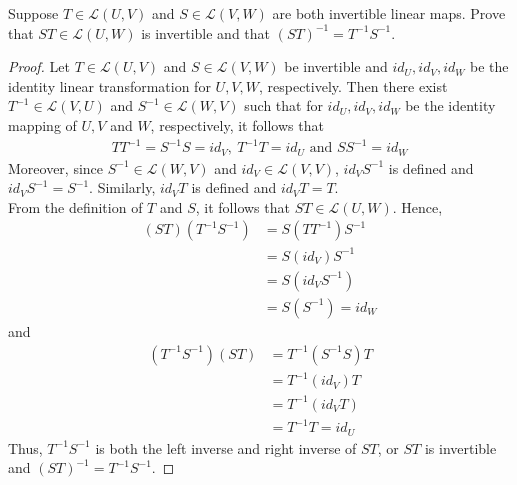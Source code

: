 \begin{question}
	\normalfont
	
	Suppose $T \in \mathcal{L}(U,V)$ and $S \in \mathcal{L}(V,W)$ are both invertible linear maps. Prove that $ST \in \mathcal{L}(U,W)$ is invertible and that $(ST)^{-1} = T^{-1}S^{-1}$. 
	
	
	\end{question}
\begin{proof}
    \renewcommand{\qedsymbol}{$\blacksquare$}
    Let $T\in\mathcal{L}(U,V)$ and $S\in\mathcal{L}(V,W)$ be invertible and $id_U,id_V,id_W$ be the identity linear transformation for $U,V,W$, respectively.
    Then there exist $T^{-1}\in\mathcal{L}(V,U)$ and $S^{-1}\in\mathcal{L}(W,V)$ such that for $id_U,id_V,id_W$ be the identity mapping of $U,V$ and $W$, respectively, 
    it follows that 
    \[
        \begin{aligned}
            TT^{-1}=S^{-1}S=id_V, \ T^{-1}T=id_U \text{ and } SS^{-1}=id_W
        \end{aligned}
    \] 
    Moreover, since $S^{-1}\in\mathcal{L}(W,V)$ and $id_V\in\mathcal{L}(V,V)$, $id_V S^{-1}$ is defined and $id_V S^{-1}=S^{-1}$.
    Similarly, $id_V T$ is defined and $id_V T=T$.\\
    From the definition of $T$ and $S$, it follows that $ST\in\mathcal{L}(U,W)$. Hence,
    \[
        \begin{aligned}
            (ST)(T^{-1}S^{-1})
            &= S(TT^{-1})S^{-1}\\
            &= S(id_V)S^{-1}\\
            &= S(id_V S^{-1})\\
            &= S(S^{-1})=id_W
        \end{aligned}
    \]
    and 
    \[
        \begin{aligned}
            (T^{-1}S^{-1})(ST)
            &= T^{-1}(S^{-1}S)T\\
            &= T^{-1}(id_V)T\\
            &= T^{-1}(id_V T)\\
            &= T^{-1}T=id_U
        \end{aligned}
    \]
    Thus, $T^{-1}S^{-1}$ is both the left inverse and right inverse of $ST$, or $ST$ is invertible and $(ST)^{-1}=T^{-1}S^{-1}$.
\end{proof}